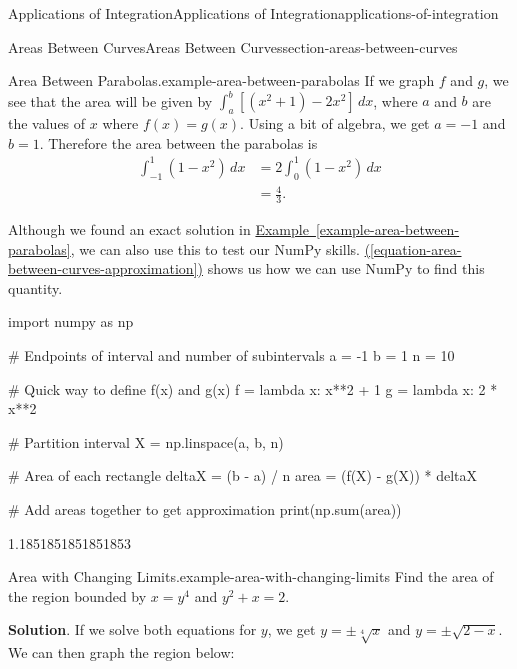 \documentclass[oneside,10pt,]{book}
\numberwithin{equation}{section}
\newcommand{\amp}{&}
\begin{document}
\begin{chapterptx}{Applications of Integration}{}{Applications of Integration}{}{}{applications-of-integration}
\begin{sectionptx}{Areas Between Curves}{}{Areas Between Curves}{}{}{section-areas-between-curves}
\begin{example}{Area Between Parabolas.}{example-area-between-parabolas}
\hypertarget{p-618}{}%
If we graph \(f\) and \(g\), we see that the area will be given by \(\int_{a}^{b}[(x^{2} + 1) - 2x^{2}]\,dx\), where \(a\) and \(b\) are the values of \(x\) where \(f(x) = g(x)\). Using a bit of algebra, we get \(a = -1\) and \(b = 1\). Therefore the area between the parabolas is%
\begin{align*}
\int_{-1}^{1}(1 - x^{2})\,dx \amp = 2\int_{0}^{1}(1-x^{2})\,dx \\
\amp = \frac{4}{3}. 
\end{align*}
%
\end{example}
\hypertarget{p-619}{}%
Although we found an exact solution in \hyperref[example-area-between-parabolas]{Example~\ref{example-area-between-parabolas}}, we can also use this to test our NumPy skills. \hyperref[equation-area-between-curves-approximation]{(\ref{equation-area-between-curves-approximation})} shows us how we can use NumPy to find this quantity.%
\begin{sageinput}
import numpy as np

# Endpoints of interval and number of subintervals
a = -1
b = 1
n = 10

# Quick way to define f(x) and g(x)
f = lambda x: x**2 + 1
g = lambda x: 2 * x**2

# Partition interval
X = np.linspace(a, b, n)

# Area of each rectangle
deltaX = (b - a) / n
area = (f(X) - g(X)) * deltaX

# Add areas together to get approximation
print(np.sum(area))
\end{sageinput}
\begin{sageoutput}
1.1851851851851853
\end{sageoutput}
\begin{example}{Area with Changing Limits.}{example-area-with-changing-limits}%
\hypertarget{p-620}{}%
Find the area of the region bounded by \(x = y^{4}\) and \(y^{2} + x = 2\).%
\par\smallskip%
\noindent\textbf{Solution}.\hypertarget{solution-135}{}\quad%
\hypertarget{p-621}{}%
If we solve both equations for \(y\), we get \(y = \pm\sqrt[4]{x}\) and \(y = \pm\sqrt{2 - x}\). We can then graph the region below:%
\begin{figure}
\centering
{
}
\end{figure}
\end{example}
\end{sectionptx}
\end{chapterptx}
\end{document}
